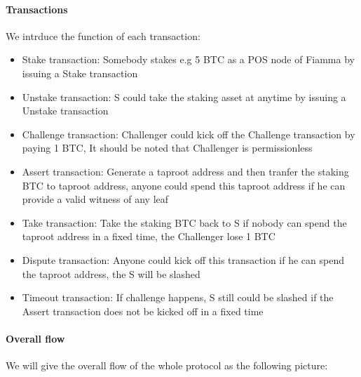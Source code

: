 \paragraph{Transactions}

We intrduce the function of each transaction:

\begin{itemize}
    \item Stake transaction: Somebody stakes e.g 5 BTC as a POS node of Fiamma by issuing a Stake transaction
    \item Unstake transaction: S could take the staking asset at anytime by issuing a Unstake transaction
    \item Challenge transaction: Challenger could kick off the Challenge transaction by paying 1 BTC, It should be noted that Challenger is permissionless
    \item Assert transaction: Generate a taproot address and then tranfer the staking BTC to taproot address, anyone could spend this taproot address if he can provide a valid witness of any leaf
    \item Take transaction: Take the staking BTC back to S if nobody can spend the taproot address in a fixed time, the Challenger lose 1 BTC
    \item Dispute transaction: Anyone could kick off this transaction if he can spend the taproot address, the S will be slashed
    \item Timeout transaction: If challenge happens, S still could be slashed if the Assert transaction does not be kicked off in a fixed time
\end{itemize}

\paragraph{Overall flow}

We will give the overall flow of the whole protocol as the following picture:

